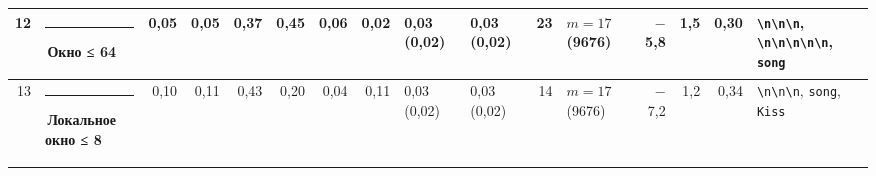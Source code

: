 \documentclass[10pt]{article}
\begin{document}
\begin{minipage}{\linewidth}
\begin{center}
{\begin{tabular}{|r|l|r|r|r|r|r|r|l|l|r|l|r|r|r|l|}
12 & \textcolor[HTML]{EDA100}{\rule{0.62em}{0.62em}}\,\textbf{Окно ≤ 64} & 0,05 & 0,05 & 0,37 & 0,45 & 0,06 & 0,02 & 0,03 (0,02) & 0,03 (0,02) & 23 & $m{=}17$ (9676) & $-$5,8 & 1,5 & 0,30 & \texttt{\textvisiblespace{}\textbackslash{}n\textbackslash{}n\textbackslash{}n}, \texttt{\textbackslash{}n\textbackslash{}n\textbackslash{}n\textbackslash{}n\textbackslash{}n}, \texttt{\textvisiblespace{}song} \\ \hline
13 & \textcolor[HTML]{1BAF7A}{\rule{0.62em}{0.62em}}\,\textbf{Локальное окно ≤ 8} & 0,10 & 0,11 & 0,43 & 0,20 & 0,04 & 0,11 & 0,03 (0,02) & 0,03 (0,02) & 14 & $m{=}17$ (9676) & $-$7,2 & 1,2 & 0,34 & \texttt{\textvisiblespace{}\textbackslash{}n\textbackslash{}n\textbackslash{}n}, \texttt{\textvisiblespace{}song}, \texttt{\textvisiblespace{}Kiss} \\ \hline
\hline\end{tabular}}\end{center}
\end{minipage}
\par\vspace{0.4em}
\end{document}
